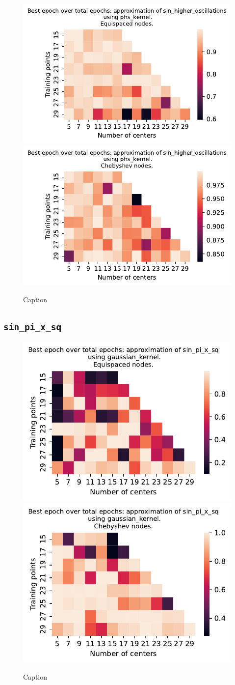 \documentclass[12pt]{report} %
\begin{document}
\begin{figure}[ht]
  \centering

  \includegraphics[width=.49\textwidth]{imagenes/experiments/1d/variational_epochs/sin_higher_oscillations-Kphs_kernel-Equi-epochs.pdf}
  \includegraphics[width=.49\textwidth]{imagenes/experiments/1d/variational_epochs/sin_higher_oscillations-Kphs_kernel-Cheb-epochs.pdf}
  \caption{Caption}
  \label{fig:epochs-sin-higher-oscillations-phs}
\end{figure}

\subsection*{\texttt{sin\_pi\_x\_sq}}

\begin{figure}[ht]
  \centering

  \includegraphics[width=.49\textwidth]{imagenes/experiments/1d/variational_epochs/sin_pi_x_sq-Kgaussian_kernel-Equi-epochs.pdf}
  \includegraphics[width=.49\textwidth]{imagenes/experiments/1d/variational_epochs/sin_pi_x_sq-Kgaussian_kernel-Cheb-epochs.pdf}
  \caption{Caption}
  \label{fig:epochs-sin-pi-x-sq-gaussian}
\end{figure}
\end{document}
